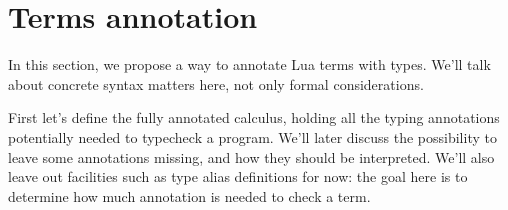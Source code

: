 
\section{Terms annotation}

In this section, we propose a way to annotate Lua terms with
types. We'll talk about concrete syntax matters here, not only formal
considerations.

First let's define the fully annotated calculus, holding all the
typing annotations potentially needed to typecheck a program. We'll
later discuss the possibility to leave some annotations missing, and
how they should be interpreted. We'll also leave out facilities such
as type alias definitions for now: the goal here is to determine how
much annotation is needed to check a term.

